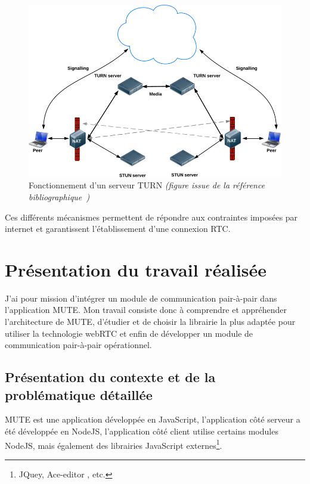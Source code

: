 \documentclass{tnreport}
\begin{document}
\begin{figure}[!h]
  \centering
  \includegraphics[width=14cm]{figures/turn}
  \caption{Fonctionnement d'un serveur TURN \emph{(figure issue de la référence bibliographique~\cite{GettingStartedwithWebRTC})}}
  \label{fig:turn}
\end{figure}

Ces différents mécanismes permettent de répondre aux contraintes imposées par internet et garantissent l'établissement d'une connexion RTC. 

\cleardoublepage

\chapter{Présentation du travail réalisée}

J'ai pour mission d'intégrer un module de communication pair-à-pair dans l'application MUTE. Mon travail consiste donc à comprendre et appréhender l'architecture de MUTE, d'étudier et de choisir la librairie la plus adaptée pour utiliser la technologie webRTC et enfin de développer un module de communication pair-à-pair opérationnel.

\section{Présentation du contexte et de la problématique détaillée}

MUTE est une application développée en JavaScript, l'application côté serveur a été développée en NodeJS, l'application côté client utilise certains modules NodeJS, mais également des librairies JavaScript externes\footnote{JQuey, Ace-editor , etc.}.
\end{document}
